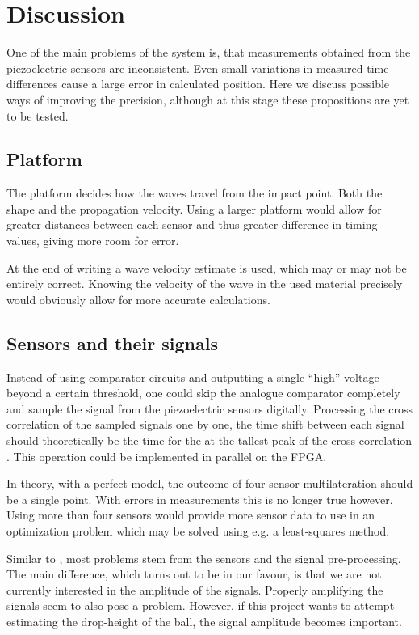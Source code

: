 \chapter{Discussion}
\label{chap:discussion}

One of the main problems of the system is, that measurements obtained from the piezoelectric sensors are inconsistent.
Even small variations in measured time differences cause a large error in calculated position.
Here we discuss possible ways of improving the precision, although at this stage these propositions are yet to be tested.

\section{Platform}
The platform decides how the waves travel from the impact point. Both the shape and the propagation velocity.
Using a larger platform would allow for greater distances between each sensor and thus greater difference in timing values, giving more room for error.

At the end of writing a wave velocity estimate is used, which may or may not be entirely correct.
Knowing the velocity of the wave in the used material precisely would obviously allow for more accurate calculations.

\section{Sensors and their signals}
Instead of using comparator circuits and outputting a single ``high'' voltage beyond a certain threshold, one could skip the analogue comparator completely and sample the signal from the piezoelectric sensors digitally.
Processing the cross correlation of the sampled signals one by one, the time shift between each signal should theoretically be the time for the at the tallest peak of the cross correlation \cite{correlationTDOA}. This operation could be implemented in parallel on the FPGA.

In theory, with a perfect model, the outcome of four-sensor multilateration should be a single point. With errors in measurements this is no longer true however. Using more than four sensors would provide more sensor data to use in an optimization problem which may be solved using e.g. a least-squares method.

Similar to \cite{anon09}, most problems stem from the sensors and the signal pre-processing.
The main difference, which turns out to be in our favour, is that we are not currently interested in the amplitude of the signals.
Properly amplifying the signals seem to also pose a problem.
However, if this project wants to attempt estimating the drop-height of the ball, the signal amplitude becomes important.


